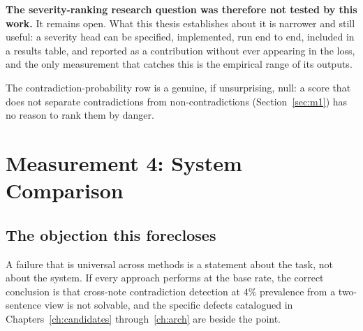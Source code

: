 \textbf{The severity-ranking research question was therefore not tested by this
work.} It remains open. What this thesis establishes about it is narrower and
still useful: a severity head can be specified, implemented, run end to end,
included in a results table, and reported as a contribution without ever
appearing in the loss, and the only measurement that catches this is the
empirical range of its outputs.

The contradiction-probability row is a genuine, if unsurprising, null: a score
that does not separate contradictions from non-contradictions
(Section~\ref{sec:m1}) has no reason to rank them by danger.

\section{Measurement 4: System Comparison}
\label{sec:m4}

\subsection{The objection this forecloses}

A failure that is universal across methods is a statement about the task, not
about the system. If every approach performs at the base rate, the correct
conclusion is that cross-note contradiction detection at $4\%$ prevalence from a
two-sentence view is not solvable, and the specific defects catalogued in
Chapters~\ref{ch:candidates} through~\ref{ch:arch} are beside the point.

